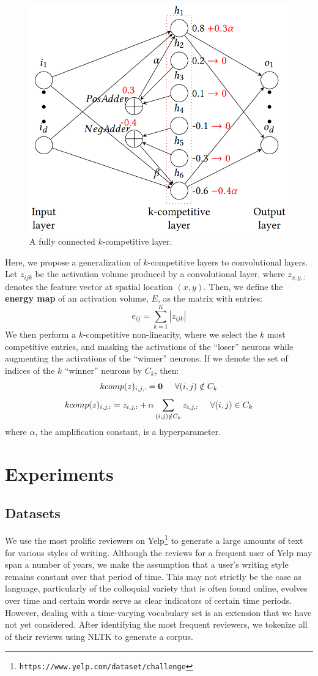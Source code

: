 \documentclass{vldb}
\begin{document}
\begin{figure}[h]
\centering
\includegraphics[width=.8\linewidth]{k_complayer.png}
\caption{\textmd{A fully connected $k$-competitive layer.}}
\end{figure}

Here, we propose a generalization of $k$-competitive layers to convolutional layers. Let $z_{ijk}$ be the activation volume produced by a convolutional layer, where $z_{x,y,:}$ denotes the feature vector at spatial location $(x,y)$. Then, we define the \textbf{energy map} of an activation volume, $E$, as the matrix with entries:
$$e_{ij} = \sum_{k=1}^K |z_{ijk}|$$
We then perform a $k$-competitive non-linearity, where we select the $k$ most competitive entries, and masking the activations of the ``loser'' neurons while augmenting the activations of the ``winner'' neurons. If we denote the set of indices of the $k$ ``winner'' neurons by $C_k$, then:
$$kcomp(z)_{i,j,:} = \textbf{0} \hspace{0.5cm} \forall (i,j) \notin C_k$$
$$kcomp(z)_{i,j,:} = z_{i,j,:} + \alpha\sum_{(i,j) \notin C_k} z_{i,j,:} \hspace{0.5cm} \forall (i,j) \in C_k$$
where $\alpha$, the amplification constant, is a hyperparameter.

\section{Experiments}
\subsection{Datasets}
We use the most prolific reviewers on Yelp\footnote{{\texttt{https://www.yelp.com/dataset/challenge}}} to generate a large amounts of text for various styles of writing. Although the reviews for a frequent user of Yelp may span a number of years, we make the assumption that a user's writing style remains constant over that period of time. This may not strictly be the case as language, particularly of the colloquial variety that is often found online, evolves over time and certain words serve as clear indicators of certain time periods. However, dealing with a time-varying vocabulary set is an extension that we have not yet considered. After identifying the most frequent reviewers, we tokenize all of their reviews using NLTK \cite{Loper02nltk:the} to generate a corpus. 
\end{document}
